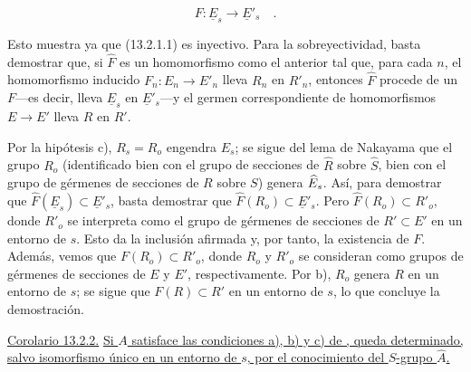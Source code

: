\begin{equation*}
 F:\underline E_s\longrightarrow\underline E'_s\quad .
\end{equation*}

\noindent
Esto muestra ya que (13.2.1.1) es inyectivo. Para la sobreyectividad,
basta demostrar que, si $\widehat F$ es un homomorfismo como el anterior
tal que, para cada $n$, el homomorfismo inducido
$F_n:E_n\longrightarrow E'_n$ lleva $R_n$ en $R'_n$, entonces
$\widehat F$ procede de un $F$---es decir, lleva $\underline E_s$ en
$\underline E'_s$---y el germen correspondiente de homomorfismos
$E\longrightarrow E'$ lleva $R$ en $R'$.


Por la hipótesis c), $R_s=R_o$ engendra $E_s$; se sigue del lema de
Nakayama que el grupo $R_o$ (identificado bien con el grupo de secciones
de $\widehat R$ sobre $\widehat S$, bien con el grupo de gérmenes de
secciones de $R$ sobre $S$) genera $\sisi{\widehat E_s}{\widehat{\underline E}_s}$. Así, para demostrar
que $\widehat F(\underline E_s)\subset\underline E'_s$, basta demostrar
que $\widehat F(R_o)\subset\underline E'_s$. Pero
$\widehat F(R_o)\subset R'_o$, donde $R'_o$ se interpreta como el grupo
de gérmenes de secciones de $R'\subset E'$ en un entorno de $s$. Esto da
la inclusión afirmada y, por tanto, la existencia de $F$. Además, vemos
que $F(R_o)\subset R'_o$, donde $R_o$ y $R'_o$ se consideran como grupos
de gérmenes de secciones de $E$ y $E'$, respectivamente. Por b), $R_o$
genera $R$ en un entorno de $s$; se sigue que $F(R)\subset R'$ en un
entorno de $s$, lo que concluye la demostración.

\medskip
\noindent
\underline{Corolario 13.2.2.} \underline{Si $A$ satisface las
condiciones a), b) y c) de , queda determinado,
salvo isomorfismo único en un entorno de $s$, por el conocimiento del
$\widehat S$-grupo $\widehat A$.}

